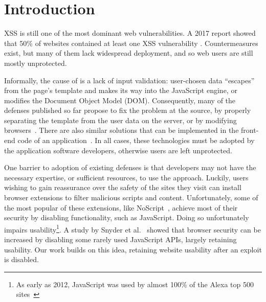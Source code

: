 \section{Introduction} \label{introduction}

\ac{XSS} is still one of the most dominant web vulnerabilities. A 2017
report showed that 50\% of websites contained at least one \ac{XSS}
vulnerability \cite{Acunetix}. Countermeasures exist, but many of them
lack widespread deployment, and so web users are still mostly
unprotected.

Informally, the cause of \xss is a lack of input validation:
user-chosen data ``escapes'' from the page's template and makes its way
into the JavaScript engine, or modifies the Document Object Model (DOM).
%
Consequently, many of the \xss defenses published so far
propose to fix the problem at the source, by properly separating the
template from the user data on the server, or by modifying
browsers~\cite{10.1145/1368088.1368112, Jim:2007:DSI:1242572.1242654,nadji2009document,Wurzinger:2009:SMX:1656360.1656379,Sundareswaran:2012:XHS:2352970.2352994}.
%
There are also similar solutions that can be implemented in the
front-end code of an application~\cite{10.1007/978-3-319-66399-9_7}.
In all cases, these technologies must be adopted by the application
software developers, otherwise users are left unprotected.

One barrier to adoption of existing \xss defenses is that developers may not have the
necessary expertise, or sufficient resources, to use the approach.
%
%
Luckily, users wishing to gain reassurance over the safety of the
sites they visit can install browser extensions to filter malicious
scripts and content. Unfortunately, some of the most popular of these
extensions, like NoScript~\cite{Noscript}, achieve most of their security
by disabling functionality, such as JavaScript. Doing so unfortunately
impairs usability\footnote{As early as 2012, 
JavaScript was used by almost 100\% of the Alexa top 500 sites~\cite{Stock:2017:WTI:3241189.3241265}}.
A study by Snyder et al.~\cite{Snyder:2017:MWD:3133956.3133966}
showed that browser security can be increased by disabling some rarely used
JavaScript APIs, largely retaining usability. Our work builds on this idea,
retaining website usability after an exploit is disabled.

